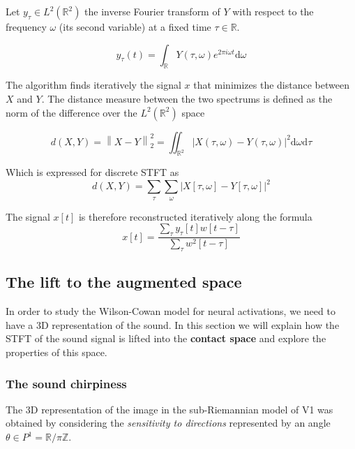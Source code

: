\documentclass[
  american,
]{article}
\begin{document}
Let \(y_\tau \in L^2(\mathbb{R}^2)\) the inverse Fourier transform of \(Y\)
with respect to the frequency \(\omega\) (its second variable)
at a fixed time \(\tau\in\mathbb{R}\).

\begin{equation}
y_\tau(t) = \int_{\mathbb{R}} Y(\tau,\omega) e^{2\pi i\omega t} \mathrm{d}\omega
\end{equation}

The algorithm finds iteratively the signal \(x\) that minimizes
the distance between \(X\) and \(Y\). The distance measure between
the two spectrums is defined as the norm of the difference
over the \(L^2(\mathbb{R}^2)\) space

\begin{equation}
d(X,Y) = \left\lVert X-Y\right\rVert_2^2
    = \iint_{\mathbb{R}^2} \left\lvert X(\tau,\omega) - Y(\tau,\omega)\right\rvert^2 \mathrm{d}\omega\mathrm{d}\tau
\end{equation}

Which is expressed for discrete STFT as
\begin{equation}
d(X,Y) = \sum_\tau \sum_\omega\left\lvert X[\tau,\omega] - Y[\tau,\omega]\right\rvert^2
\end{equation}

The signal \(x[t]\) is therefore reconstructed iteratively along the formula
\begin{equation}
x[t] = \frac{\sum\limits_\tau y_\tau[t]w[t-\tau]}{\sum\limits_\tau w^2[t-\tau]}
\end{equation}

\hypertarget{the-lift-to-the-augmented-space}{%
\subsection{The lift to the augmented space}\label{the-lift-to-the-augmented-space}}

In order to study the Wilson-Cowan model for neural activations,
we need to have a 3D representation of the sound.
In this section we will explain how the STFT of the sound signal
is lifted into the \textbf{contact space} and explore the properties of this space.

\hypertarget{the-sound-chirpiness}{%
\subsubsection{The sound chirpiness}\label{the-sound-chirpiness}}

The 3D representation of the image in the sub-Riemannian model of V1
was obtained by considering the \emph{sensitivity to directions}
represented by an angle \(\theta\in P^1=\mathbb{R}/\pi\mathbb{Z}\).
\end{document}
